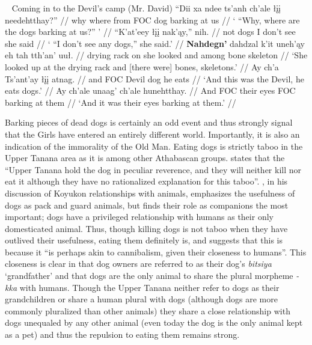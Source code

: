 \pex~ Coming in to the Devil's camp (Mr. David) 
\a
\begingl
\gla ``{Dii xa} ndee ts'anh ch'ale łįį needehtthay?''   //
\glb why where from FOC dog {barking at us}  //
\glft ` ``Why, where are the dogs barking at us?'' ' //
\endgl
\a
\begingl
\gla ``K'at'eey łįį nak'ąy,'' nih.  //
\glb not dogs {I don't see} {she said}  //
\glft ` ``I don't see any dogs,'' she said.' //
\endgl
\a
\begingl
\gla  \textbf{Nahdegn'} dahdzal k'it uneh'ąy eh tah tth'an' uuł.  //
 {drying rack} on {she looked} and among bone skeleton //
\glft `She looked up at the drying rack and [there were] bones, skeletons.' //
\endgl
\a
\begingl
\gla  Ay ch'a Ts'ant'ay łįį atnag.   //
\glb  and FOC Devil dog {he eats} //
\glft `And this was the Devil, he eats dogs.' //
\endgl
\a
\begingl
\gla  Ay ch'ale unaag' ch'ale hunehtthay.  //
\glb  And FOC {their eyes} FOC {barking at them} //
\glft `And it was their eyes barking at them.' //
\endgl
\xe

Barking pieces of dead dogs is certainly an odd event and thus strongly signal that the Girls have entered an entirely different world. Importantly, it is also an indication of the immorality of the Old Man. Eating dogs is strictly taboo in the Upper Tanana area as it is among other Athabascan groups. \citet[162]{McKennanR1959} states that the ``Upper Tanana hold the dog in peculiar reverence, and they will neither kill nor eat it although they have no rationalized explanation for this taboo''. \citet{NelsonR1983}, in his discussion of Koyukon relationships with animals, emphasizes the usefulness of dogs as pack and guard animals, but finds their role as companions the most important; dogs have a privileged relationship with humans as their only domesticated animal. Thus, though killing dogs is not taboo when they have outlived their usefulness, eating them definitely is, and \citet[191]{NelsonR1983} suggests that this is because it ``is perhaps akin to cannibalism, given their closeness to humans''. This closeness is clear in that dog owners are referred to as their dog's {\em bitsiya} `grandfather' and that dogs are the only animal to share the plural morpheme {\em -kka} with humans. Though the Upper Tanana neither refer to dogs as their grandchildren or share a human plural with dogs (although dogs are more commonly pluralized than other animals) they share a close relationship with dogs unequaled by any other animal (even today the dog is the only animal kept as a pet) and thus the repulsion to eating them remains strong.

